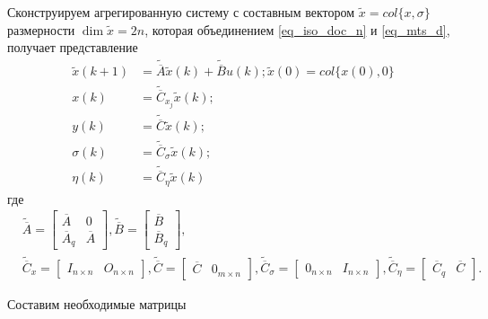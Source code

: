 Сконструируем агрегированную систему с составным вектором \newline $\tilde{x}=col\{x,\sigma\}$ размерности $ \dim \tilde{x} = 2n$, которая объединением \ref{eq_iso_doc_n} и \ref{eq_mts_d}, получает представление
\begin{align}\label{rang_system_d_3}
	\tilde{x}(k+1) &= \tilde{\overline{A}} \tilde{x} (k) + \tilde{\overline{B}} u(k); 
	\tilde{x} (0) = col \{x(0), 0\}\\
	x(k) &= \tilde{\overline{C}}_{x_j} \tilde{x}(k);\\
	y(k) &= \tilde{\overline{C}} \tilde{x} (k);\\
	\sigma (k) &= \tilde{\overline{C}}_{\sigma} \tilde{x} (k);\\
	\eta (k) &= \tilde{\overline{C}}_{\eta} \tilde{x} (k)
\end{align}
где 
\begin{align*}
	&\tilde{\overline{A}} =
	\begin{bmatrix}
	\overline{A} & 0\\
	\overline{A}_{q} & \overline{A}
	\end{bmatrix},
	\tilde{\overline{B}} = 
	\begin{bmatrix}
	\overline{B}\\
	\overline{B}_{q}
	\end{bmatrix},\\
	&\tilde{\overline{C}}_{x} = 
	\begin{bmatrix}
	I_{n \times n} & O_{n \times n}
	\end{bmatrix},
	\tilde{\overline{C}} = 
	\begin{bmatrix}
	\overline{C} & 0_{m \times n}
	\end{bmatrix},
	\tilde{\overline{C}}_{\sigma} = 
	\begin{bmatrix}
	0_{n \times n} & I_{n \times n}
	\end{bmatrix},
	\tilde{\overline{C}}_{\eta} = 
	\begin{bmatrix}
	\overline{C}_{q} & \overline{C}
	\end{bmatrix}.	
\end{align*}

Составим необходимые матрицы

